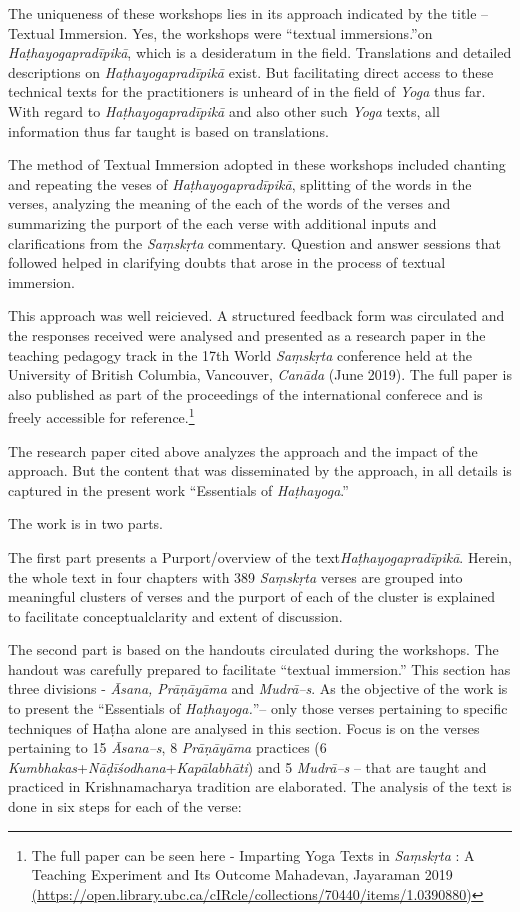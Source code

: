 The uniqueness of these workshops lies in its approach indicated by the title – Textual Immersion. Yes, the workshops were “textual immersions.”on \textit{Haṭhayogapradīpikā}, which is a desideratum in the field. Translations and detailed descriptions on \textit{Haṭhayogapradīpikā} exist. But facilitating direct access to these technical texts for the practitioners is unheard of in the field of \textit{Yoga} thus far. With regard to \textit{Haṭhayogapradīpikā} and also other such \textit{Yoga} texts, all information thus far taught is based on translations.
\smallskip

The method of Textual Immersion adopted in these workshops included chanting and repeating the veses of \textit{Haṭhayogapradīpikā}, splitting of the words in the verses, analyzing the meaning of the each of the words of the verses and summarizing the purport of the each verse with additional inputs and clarifications from the \textit{Saṃskṛta} commentary. Question and answer sessions that followed helped in clarifying doubts that arose in the process of textual immersion.
\smallskip

This approach was well reicieved. A structured feedback form was circulated and the responses received were  analysed and presented as a research paper in the teaching pedagogy track in the 17th World \textit{Saṃskṛta} conference held at the University of British Columbia, Vancouver, \textit{Canāda} (June 2019). The full paper is also published as part of the proceedings of the international conferece and is freely accessible for reference.\footnote{The full paper can be seen here - Imparting Yoga Texts in \textit{Saṃskṛta} : A Teaching Experiment and Its Outcome Mahadevan, Jayaraman 2019 \url{(https://open.library.ubc.ca/cIRcle/collections/70440/items/1.0390880)}}
\smallskip

The research paper cited above analyzes the approach and the impact of the approach. But the content that was disseminated by the approach, in all details is captured in the present work “Essentials of \textit{Haṭhayoga}.”

The work is in two parts.

The first part presents a Purport/overview of the text\break \textit{Haṭhayogapradīpikā}. Herein, the whole text in four chapters with 389 \textit{Saṃskṛta} verses are grouped into meaningful clusters of verses and the purport of each of the cluster is explained to facilitate conceptual\break clarity and extent of discussion.

The second part is based on the handouts circulated during the workshops. The handout was carefully prepared to facilitate “textual immersion.” This section has three divisions - \textit{Āsana, Prāṇāyāma} and \textit{Mudrā–s}. As the objective of the work is to present the “Essentials of \textit{Haṭhayoga.}”– only those verses pertaining to specific techniques of Haṭha alone are analysed in this section. Focus is on the verses pertaining to 15 \textit{Āsana–s}, 8 \textit{Prāṇāyāma} practices (6 \textit{Kumbhakas}+\textit{Nāḍīśodhana}+\textit{Kapālabhāti}) and 5 \textit{Mudrā–s} – that are taught and practiced in Krishnamacharya tradition are elaborated. The analysis of the text is done in six steps for each of the verse:

